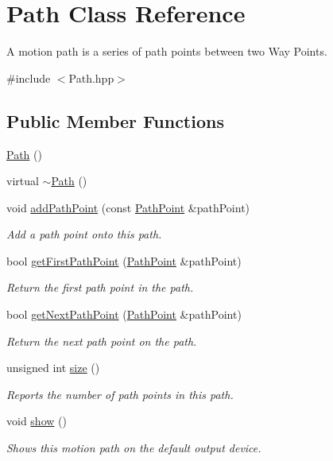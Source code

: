 \hypertarget{classPath}{\section{Path Class Reference}
\label{classPath}
}


A motion path is a series of path points between two Way Points.  




{\ttfamily \#include $<$Path.\-hpp$>$}

\subsection*{Public Member Functions}
\begin{DoxyCompactItemize}
\item 
\hyperlink{classPath_af26cfab021ddf49af73da3b2beca85ac}{Path} ()
\item 
virtual \hyperlink{classPath_a141da9ff89c85e0ba410b5a73864c267}{$\sim$\-Path} ()
\item 
void \hyperlink{classPath_a8d5ea7007516aeda4a10c61d59051c6c}{add\-Path\-Point} (const \hyperlink{classPathPoint}{Path\-Point} \&path\-Point)
\begin{DoxyCompactList}\small\item\em Add a path point onto this path. \end{DoxyCompactList}\item 
bool \hyperlink{classPath_a05cef868b03ff1f01fd54bb2801b3af6}{get\-First\-Path\-Point} (\hyperlink{classPathPoint}{Path\-Point} \&path\-Point)
\begin{DoxyCompactList}\small\item\em Return the first path point in the path. \end{DoxyCompactList}\item 
bool \hyperlink{classPath_a9b6d6aa8279ff4c475ad03b471f8bf2d}{get\-Next\-Path\-Point} (\hyperlink{classPathPoint}{Path\-Point} \&path\-Point)
\begin{DoxyCompactList}\small\item\em Return the next path point on the path. \end{DoxyCompactList}\item 
unsigned int \hyperlink{classPath_aab30b48bfb68c8070cf4b70738f785d5}{size} ()
\begin{DoxyCompactList}\small\item\em Reports the number of path points in this path. \end{DoxyCompactList}\item 
void \hyperlink{classPath_acda7c567cd035d2f0a8661c53880bc4b}{show} ()
\begin{DoxyCompactList}\small\item\em Shows this motion path on the default output device. \end{DoxyCompactList}\end{DoxyCompactItemize}
